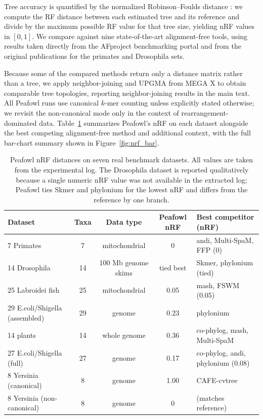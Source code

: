 \documentclass[11pt]{article}
\begin{document}
Tree accuracy is quantified by the normalized Robinson--Foulds distance
\citep{robinson1981rf}: we compute the RF distance between each estimated
tree and its reference and divide by the maximum possible RF value for
that tree size, yielding nRF values in $[0, 1]$. We compare against nine
state-of-the-art alignment-free tools, using results taken directly from
the AFproject benchmarking portal and from the original publications for
the primates and Drosophila sets.

Because some of the compared methods return only a distance matrix rather
than a tree, we apply neighbor-joining \citep{saitou1987nj} and UPGMA
\citep{sokal1958upgma} from MEGA X \citep{kumar2018megax} to obtain
comparable tree topologies, reporting neighbor-joining results in the main
text. All Peafowl runs use canonical $k$-mer counting unless explicitly
stated otherwise; we revisit the non-canonical mode only in the context of
rearrangement-dominated data. Table~\ref{tab:main_results} summarizes
Peafowl's nRF on each dataset alongside the best competing alignment-free
method and additional context, with the full bar-chart summary shown in
Figure~\ref{fig:nrf_bar}.

\begin{table}[htbp]
\centering
\caption{Peafowl nRF distances on seven real benchmark datasets. All values
are taken from the experimental log. The Drosophila dataset is reported
qualitatively because a single numeric nRF value was not available in the
extracted log; Peafowl ties Skmer and phylonium for the lowest nRF and
differs from the reference by one branch.}
\label{tab:main_results}
\begin{tabular}{lcccl}
\toprule
Dataset & Taxa & Data type & Peafowl nRF & Best competitor (nRF) \\
\midrule
7 Primates & 7 & mitochondrial & 0 & andi, Multi-SpaM, FFP (0) \\
14 Drosophila & 14 & 100 Mb genome skims & tied best & Skmer, phylonium (tied) \\
25 Labroidei fish & 25 & mitochondrial & 0.05 & mash, FSWM (0.05) \\
29 E.coli/Shigella (assembled) & 29 & genome & 0.23 & phylonium \\
14 plants & 14 & whole genome & 0.36 & co-phylog, mash, Multi-SpaM \\
27 E.coli/Shigella (full) & 27 & genome & 0.17 & co-phylog, andi, phylonium (0.08) \\
8 Yersinia (canonical) & 8 & genome & 1.00 & CAFE-cvtree \\
8 Yersinia (non-canonical) & 8 & genome & 0 & (matches reference) \\
\bottomrule
\end{tabular}
\end{table}
\end{document}
